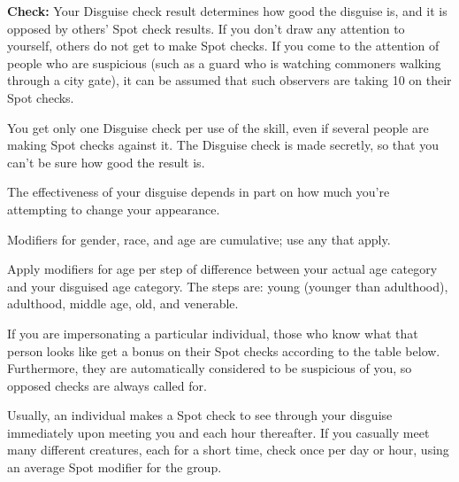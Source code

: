 \textbf{Check:} Your Disguise check result determines how good the disguise is, and it is opposed by others' Spot check results. If you don't draw any attention to yourself, others do not get to make Spot checks. If you come to the attention of people who are suspicious (such as a guard who is watching commoners walking through a city gate), it can be assumed that such observers are taking 10 on their Spot checks.

You get only one Disguise check per use of the skill, even if several people are making Spot checks against it. The Disguise check is made secretly, so that you can't be sure how good the result is.

The effectiveness of your disguise depends in part on how much you're attempting to change your appearance.


Modifiers for gender, race, and age are cumulative; use any that apply.

Apply modifiers for age per step of difference between your actual age category and your disguised age category. The steps are: young (younger than adulthood), adulthood, middle age, old, and venerable.


If you are impersonating a particular individual, those who know what that person looks like get a bonus on their Spot checks according to the table below. Furthermore, they are automatically considered to be suspicious of you, so opposed checks are always called for.


Usually, an individual makes a Spot check to see through your disguise immediately upon meeting you and each hour thereafter. If you casually meet many different creatures, each for a short time, check once per day or hour, using an average Spot modifier for the group.

